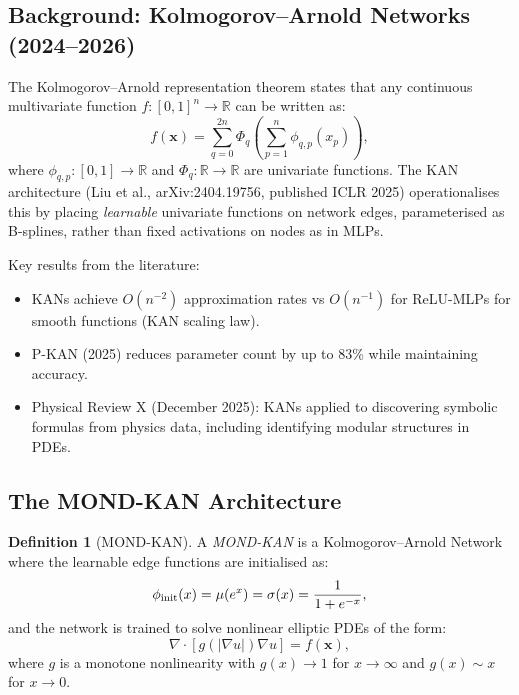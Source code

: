 \documentclass[11pt]{article}
\theoremstyle{definition}
\newtheorem{definition}[theorem]{Definition}
\theoremstyle{remark}
\begin{document}
\subsection{Background: Kolmogorov--Arnold Networks (2024--2026)}
\label{sec:kan-background}

The Kolmogorov--Arnold representation theorem states that any continuous
multivariate function $f: [0,1]^n \to \mathbb{R}$ can be written as:
\begin{equation}
  f(\mathbf{x}) = \sum_{q=0}^{2n} \Phi_q\!\left(\sum_{p=1}^n \phi_{q,p}(x_p)\right),
  \label{eq:ka-theorem}
\end{equation}
where $\phi_{q,p}: [0,1] \to \mathbb{R}$ and $\Phi_q: \mathbb{R} \to \mathbb{R}$
are univariate functions. The KAN architecture (Liu et al., arXiv:2404.19756,
published ICLR 2025) operationalises this by placing \emph{learnable}
univariate functions on network edges, parameterised as B-splines, rather
than fixed activations on nodes as in MLPs.

Key results from the literature:
\begin{itemize}[nosep]
\item KANs achieve $O(n^{-2})$ approximation rates vs $O(n^{-1})$ for
  ReLU-MLPs for smooth functions (KAN scaling law).
\item P-KAN (2025) reduces parameter count by up to 83\% while maintaining accuracy.
\item Physical Review X (December 2025): KANs applied to discovering symbolic
  formulas from physics data, including identifying modular structures in PDEs.
\end{itemize}

\subsection{The MOND-KAN Architecture}
\label{sec:mond-kan-architecture}

\begin{definition}[MOND-KAN]
\label{def:mond-kan}
A \emph{MOND-KAN} is a Kolmogorov--Arnold Network where the learnable
edge functions are initialised as:
\begin{equation}
  \phi_{\rm init}(x) = \mu(e^x) = \sigma(x) = \frac{1}{1 + e^{-x}},
  \label{eq:mond-kan-init}
\end{equation}
and the network is trained to solve nonlinear elliptic PDEs of the form:
\begin{equation}
  \nabla \cdot [g(|\nabla u|) \nabla u] = f(\mathbf{x}),
  \label{eq:nonlinear-elliptic}
\end{equation}
where $g$ is a monotone nonlinearity with $g(x) \to 1$ for $x \to \infty$
and $g(x) \sim x$ for $x \to 0$.
\end{definition}
\end{document}
